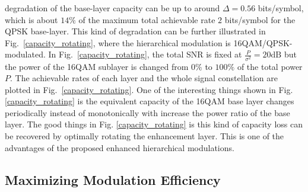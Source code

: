 \documentclass[10pt,fleqn, twocolumn]{IEEEtran}
\begin{document}
degradation of the base-layer capacity can be up to around
$\Delta=0.56$ bits/symbol, which is about $14\%$ of the maximum
total achievable rate $2$ bits/symbol for the QPSK base-layer.
This kind of degradation can be further illustrated in
Fig.~\ref{capacity_rotating}, where the hierarchical modulation is
16QAM/QPSK-modulated. In Fig.~\ref{capacity_rotating}, the total
SNR is fixed at $\frac{P}{\sigma^2}=20\mbox{dB}$ but the power of
the 16QAM sublayer is changed from $0\%$ to $100\%$ of the total
power $P$. The achievable rates of each layer and the whole signal
constellation are plotted in Fig.~\ref{capacity_rotating}. One of
the interesting things shown in Fig. \ref{capacity_rotating} is
the equivalent capacity of the 16QAM base layer changes
periodically instead of monotonically with increase the power
ratio of the base layer. The good things in Fig.
\ref{capacity_rotating} is this kind of capacity loss can be
recovered by optimally rotating the enhancement layer. This is one
of the advantages of the proposed enhanced hierarchical
modulations.
\begin{figure}
\end{figure}

\subsection{Maximizing Modulation Efficiency}
\end{document}
